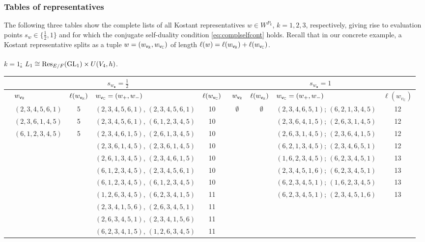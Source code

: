 \documentclass[a4paper,10pt]{amsart}
\theoremstyle{definition}
\numberwithin{equation}{section}
\def\GL{{\rm GL}}
\def\vv{{\sf v}} %
\begin{document}
\subsubsection{Tables of representatives}\label{sect:tablesw}

The following three tables show the complete lists of all Kostant representatives $w\in W^{P_k}$, $k=1,2,3$, respectively, giving rise to evaluation points $s_w\in\{\tfrac12,1\}$ and for which the conjugate self-duality condition \eqref{eq:complselfcont} holds. Recall that in our concrete example, a Kostant representative splits as a tuple $w=(w_{\vv_{\mathbb R}},w_{\vv_{\mathbb C}})$ of length $\ell(w)=\ell(w_{\vv_{\mathbb R}})+\ell(w_{\vv_{\mathbb C}})$.\\\\
\small
\underline{$k=1$:} $L_1\cong {\rm Res}_{E/F}(\GL_1) \times U(V_4,h)$. 
\begin{center}
\tiny
\setlength{\tabcolsep}{2pt}\renewcommand{\arraystretch}{1.06}
\begin{longtable}{r p{1.78cm} c p{4cm} c | p{1.78cm} c p{4.15cm} c}
\toprule
& \multicolumn{4}{c|}{$s_{w_\bullet}=\frac12$} & \multicolumn{4}{c}{$s_{w_\bullet}=1$}\\
\midrule
& \(w_{\vv_{\mathbb R}}\)  & $\ell(w_{\vv_{\mathbb R}} )$ & \quad $w_{\vv_{\mathbb C}}=(w_+, w_-)$ & $\ell(w_{\vv_{\mathbb C}})$ & \ \(w_{\vv_{\mathbb R}}\)  & $\ell(w_{\vv_{\mathbb R}} )$ & \quad $w_{\vv_{\mathbb C}}=(w_+, w_-)$ & \(\ell(w_{v_{\mathbb C}})\)\\
\midrule
\endhead
& $(2,3,4,5,6,1)$ & 5 & $(2,3,4,5,6,1)$, $(2,3,4,5,6,1)$ & 10 &  \ \  $\emptyset$ &  \  $\emptyset$& $(2,3,4,6,5,1)$; $(6,2,1,3,4,5)$ & 12\\
& $(2,3,6,1,4,5)$ & 5 & $(2,3,4,5,6,1)$, $(6,1,2,3,4,5)$ & 10 &  &  & $(2,3,6,4,1,5)$; $(2,6,3,1,4,5)$ & 12\\
 & $(6,1,2,3,4,5)$ & 5 & $(2,3,4,6,1,5)$, $(2,6,1,3,4,5)$ & 10 &  &  & $(2,6,3,1,4,5)$; $(2,3,6,4,1,5)$ & 12\\
 &  &  & $(2,3,6,1,4,5)$, $(2,3,6,1,4,5)$ & 10 &  &  & $(6,2,1,3,4,5)$; $(2,3,4,6,5,1)$ & 12\\
 &  &  & $(2,6,1,3,4,5)$, $(2,3,4,6,1,5)$ & 10 &  &  & $(1,6,2,3,4,5)$; $(6,2,3,4,5,1)$ & 13\\
 &  &  & $(6,1,2,3,4,5)$, $(2,3,4,5,6,1)$ & 10 &  &  & $(2,3,4,5,1,6)$; $(6,2,3,4,5,1)$ & 13\\
 &  &  & $(6,1,2,3,4,5)$, $(6,1,2,3,4,5)$ & 10 &  &  & $(6,2,3,4,5,1)$; $(1,6,2,3,4,5)$ & 13\\
 &  &  & $(1,2,6,3,4,5)$, $(6,2,3,4,1,5)$ & 11 &  &  & $(6,2,3,4,5,1)$; $(2,3,4,5,1,6)$ & 13\\
 &  &  & $(2,3,4,1,5,6)$, $(2,6,3,4,5,1)$ & 11 &  &  &  & \\
 &  &  & $(2,6,3,4,5,1)$, $(2,3,4,1,5,6)$ & 11 &  &  &  & \\
 &  &  & $(6,2,3,4,1,5)$, $(1,2,6,3,4,5)$ & 11 &  &  &  & \\
\bottomrule
\end{longtable}
\normalsize
\end{center}
\end{document}
